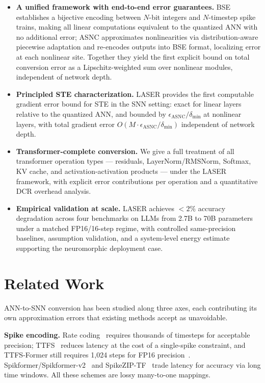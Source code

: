 \documentclass{article}
\theoremstyle{plain}
\theoremstyle{definition}
\theoremstyle{remark}
\begin{document}
\begin{itemize}
  \item \textbf{A unified framework with end-to-end error guarantees.}
        BSE establishes a bijective encoding between $N$-bit integers and $N$-timestep spike trains, making all linear computations equivalent to the quantized ANN with no additional error; ASNC approximates nonlinearities via distribution-aware piecewise adaptation and re-encodes outputs into BSE format, localizing error at each nonlinear site. Together they yield the first explicit bound on total conversion error as a Lipschitz-weighted sum over nonlinear modules, independent of network depth.
 
  \item \textbf{Principled STE characterization.}
        LASER provides the first computable gradient error bound for STE in the SNN setting: exact for linear layers relative to the quantized ANN, and bounded by $\epsilon_\mathrm{ASNC}/\delta_\mathrm{min}$ at nonlinear layers, with total gradient error $O(M \cdot \epsilon_\mathrm{ASNC}/\delta_\mathrm{min})$ independent of network depth.
 
  \item \textbf{Transformer-complete conversion.}
        We give a full treatment of all transformer operation types — residuals, LayerNorm/RMSNorm, Softmax, KV cache, and activation-activation products — under the LASER framework, with explicit error contributions per operation and a quantitative DCR overhead analysis.
 
  \item \textbf{Empirical validation at scale.}
        LASER achieves $<\!2\%$ accuracy degradation across four benchmarks on LLMs from 2.7B to 70B parameters under a matched FP16/16-step regime, with controlled same-precision baselines, assumption validation, and a system-level energy estimate supporting the neuromorphic deployment case.
\end{itemize}

\section{Related Work}
\label{sec:related_works}

ANN-to-SNN conversion has been studied along three axes, each contributing its own approximation errors that existing methods accept as unavoidable.

\noindent\textbf{Spike encoding.}
Rate coding~\citep{rueckauer2017conversion,auge2021encoding,guo2021coding} requires thousands of timesteps for acceptable precision; TTFS~\citep{bonilla2022ttfs,stanojevic2024ttfs} reduces latency at the cost of a single-spike constraint, and TTFS-Former still requires 1,024 steps for FP16 precision~\citep{ZhaoHuangDingYu2025_TTFSFormer}. Spikformer/Spikformer-v2~\citep{zhou2023spikformer,zhou2024spikformerv2} and SpikeZIP-TF~\citep{you2024spikeziptf} trade latency for accuracy via long time windows. All these schemes are lossy many-to-one mappings.
\end{document}
